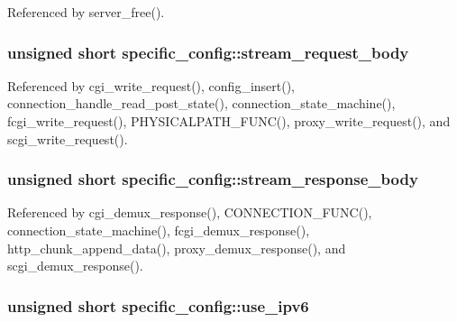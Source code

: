 Referenced by server\-\_\-free().

\hypertarget{structspecific__config_a1a2aa3f499d362cd2c898406e9fde056}{
\subsubsection[{stream\-\_\-request\-\_\-body}]{\setlength{\rightskip}{0pt plus 5cm}unsigned short specific\-\_\-config\-::stream\-\_\-request\-\_\-body}}\label{structspecific__config_a1a2aa3f499d362cd2c898406e9fde056}


Referenced by cgi\-\_\-write\-\_\-request(), config\-\_\-insert(), connection\-\_\-handle\-\_\-read\-\_\-post\-\_\-state(), connection\-\_\-state\-\_\-machine(), fcgi\-\_\-write\-\_\-request(), P\-H\-Y\-S\-I\-C\-A\-L\-P\-A\-T\-H\-\_\-\-F\-U\-N\-C(), proxy\-\_\-write\-\_\-request(), and scgi\-\_\-write\-\_\-request().

\hypertarget{structspecific__config_aaff6722b336ebe2189316f73fa8c21c4}{
\subsubsection[{stream\-\_\-response\-\_\-body}]{\setlength{\rightskip}{0pt plus 5cm}unsigned short specific\-\_\-config\-::stream\-\_\-response\-\_\-body}}\label{structspecific__config_aaff6722b336ebe2189316f73fa8c21c4}


Referenced by cgi\-\_\-demux\-\_\-response(), C\-O\-N\-N\-E\-C\-T\-I\-O\-N\-\_\-\-F\-U\-N\-C(), connection\-\_\-state\-\_\-machine(), fcgi\-\_\-demux\-\_\-response(), http\-\_\-chunk\-\_\-append\-\_\-data(), proxy\-\_\-demux\-\_\-response(), and scgi\-\_\-demux\-\_\-response().

\hypertarget{structspecific__config_a187947aee4cd98be178d5e24d3602098}{
\subsubsection[{use\-\_\-ipv6}]{\setlength{\rightskip}{0pt plus 5cm}unsigned short specific\-\_\-config\-::use\-\_\-ipv6}}\label{structspecific__config_a187947aee4cd98be178d5e24d3602098}


